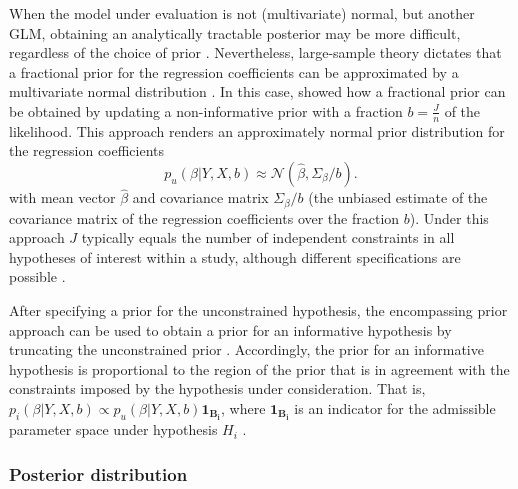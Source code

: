 \documentclass[review, 3p, authoryear]{elsarticle} %
\begin{document}
When the model under evaluation is not (multivariate) normal, but another GLM, obtaining an analytically tractable posterior may be more difficult, regardless of the choice of prior \citep{bda2013}.
Nevertheless, large-sample theory dictates that a fractional prior for the regression coefficients can be approximated by a multivariate normal distribution \citep{bda2013}.
In this case, \citet{gu_approximated_2018} showed how a fractional prior can be obtained by updating a non-informative prior with a fraction \(b = \frac{J}{n}\) of the likelihood.
This approach renders an approximately normal prior distribution for the regression coefficients
\[
p_u(\beta | Y, X, b) \approx \mathcal{N}(\hat{\beta}, \Sigma_\beta / b).
\]
with mean vector \(\hat{\beta}\) and covariance matrix \(\Sigma_{\beta}/b\) (the unbiased estimate of the covariance matrix of the regression coefficients over the fraction \(b\)).
Under this approach \(J\) typically equals the number of independent constraints in all hypotheses of interest within a study, although different specifications are possible \citep[for an elaborate discussion on appropriate values for \(J\), see][]{gu_approximated_2018, hoijtink_prior_2021}.

After specifying a prior for the unconstrained hypothesis, the encompassing prior approach can be used to obtain a prior for an informative hypothesis by truncating the unconstrained prior \citep[e.g.,][]{klugkist_inequality_2005, mulder_equality_2010, mulder_prior_2014}.
Accordingly, the prior for an informative hypothesis is proportional to the region of the prior that is in agreement with the constraints imposed by the hypothesis under consideration.
That is, \(p_i(\beta | Y, X, b) \propto p_u(\beta | Y, X, b)\boldsymbol{1}_{\boldsymbol{B_i}}\), where \(\boldsymbol{1}_{\boldsymbol{B_i}}\) is an indicator for the admissible parameter space under hypothesis \(H_i\) \citep{gu_approximated_2018}.

\hypertarget{posterior-distribution}{%
\subsubsection{Posterior distribution}\label{posterior-distribution}}
\end{document}
